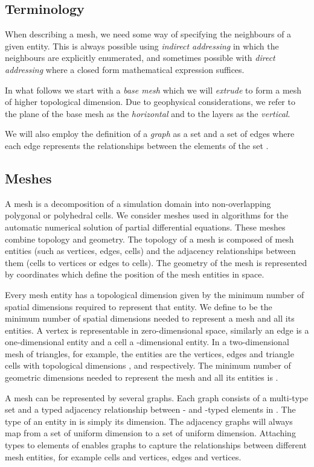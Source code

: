 \documentclass[11pt, a4paper]{scrartcl}
\begin{document}
\subsection{Terminology}
\label{ssec:mesh-terminology}
When describing a mesh, we need some way of specifying the neighbours
of a given entity.  This is always possible using \emph{indirect
  addressing} in which the neighbours are explicitly enumerated, and
sometimes possible with \emph{direct addressing} where a closed form
mathematical expression suffices.

In what follows we start with a \emph{base mesh} which we will
\emph{extrude} to form a mesh of higher topological dimension.  Due to
geophysical considerations, we refer to the plane of the base mesh as
the \emph{horizontal} and to the layers as the \emph{vertical}.

We will also employ the definition of a \emph{graph} as a set  and
a set  of edges where each edge represents the relationships
between the elements of the set .

\subsection{Meshes}
\label{ssec:mesh-representation}

A mesh is a decomposition of a simulation domain into non-overlapping
polygonal or polyhedral cells. We consider meshes used in algorithms
for the automatic numerical solution of partial differential
equations. These meshes combine topology and geometry. The topology of
a mesh is composed of mesh entities (such as vertices, edges, cells)
and the adjacency relationships between them (cells to vertices or
edges to cells). The geometry of the mesh is represented by
coordinates which define the position of the mesh entities in space.

Every mesh entity has a topological dimension given by the minimum
number of spatial dimensions required to represent that entity. We
define  to be the minimum number of spatial dimensions needed to
represent a mesh and all its entities. A vertex is representable in
zero-dimensional space, similarly an edge is a one-dimensional entity
and a cell a -dimensional entity. In a two-dimensional mesh of
triangles, for example, the entities are the vertices, edges and
triangle cells with topological dimensions ,  and 
respectively. The minimum number of geometric dimensions needed to
represent the mesh and all its entities is .

A mesh can be represented by several graphs. Each graph consists of a
multi-type set  and a typed adjacency relationship
 between - and -typed elements in
. The type of an entity in  is simply its dimension. The
adjacency graphs will always map from a set of uniform dimension to a
set of uniform dimension.  Attaching types to elements of  enables
graphs to capture the relationships between different mesh entities,
for example cells and vertices, edges and vertices.
\end{document}
